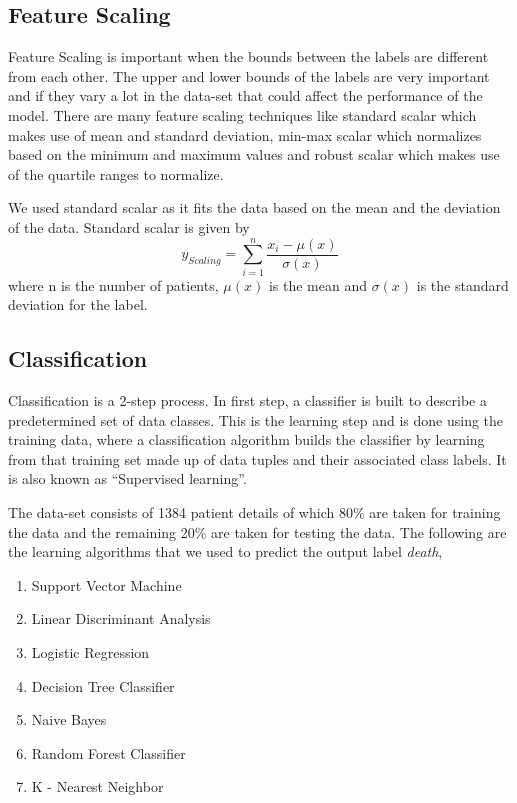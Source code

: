 \documentclass[conference]{IEEEtran}
\begin{document}
\subsection{Feature Scaling}
\label{ssec:featurescale}
Feature Scaling is important when the bounds between the labels are different from each other. The upper and lower bounds of the labels are very important and if they vary a lot in the data-set that could affect the performance of the model. There are many feature scaling techniques like standard scalar which makes use of mean and standard deviation, min-max scalar which normalizes based on the minimum and maximum values and robust scalar which makes use of the quartile ranges to normalize.
\par 
We used standard scalar as it fits the data based on the mean and the deviation of the data. Standard scalar is given by 
\begin{equation}
 y_{Scaling} = \sum\limits_{i=1}^{n}\frac{x_i - \mu(x) }{\sigma(x)}
\end{equation}
where n is the number of patients, $\mu(x)$ is the mean and 
$\sigma(x)$ is the standard deviation for the label.
\subsection{Classification}
\label{ssec:classification}
Classification is a 2-step process. In first step, a classifier is built to describe a predetermined set of data classes. This is the learning step and is done using the training data, where a classification algorithm builds the classifier by learning from that training set made up of data tuples and their associated class labels. It is also known as “Supervised learning”. 
\par
The data-set consists of 1384 patient details of which 80\% are taken for training the data and the remaining 20\% are taken for testing the data. The following are the learning algorithms that we used to predict the output label \textit{death},
\begin{enumerate}
\item Support Vector Machine
\item Linear Discriminant Analysis
\item Logistic Regression
\item Decision Tree Classifier
\item Naive Bayes
\item Random Forest Classifier
\item K - Nearest Neighbor
\end{enumerate}
\par
\end{document}
